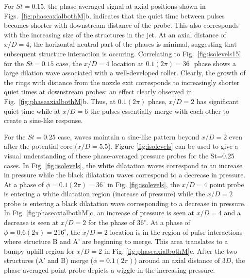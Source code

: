 \documentclass[english]{aiaa-tc}
\begin{document}
For $St=0.15$, the phase averaged signal at axial positions shown in
Figs.~\ref{fig:phaseaxialbothM}b, indicates that the quiet time between
pulses becomes shorter with downstream distance of the probe.  This
also corresponds with the increasing size of the structures in the jet. At an
axial distance of $x/D=4$, the horizontal neutral part of the phases
is minimal, suggesting that subsequent structure interaction is occuring.  Correlating to
Fig.~\ref{fig:isolevels15} for the $St=0.15$ case, the $x/D=4$ location at
$0.1(2\pi)=36^\circ$ phase shows a large dilation wave associated with
a well-developed roller. Clearly, the growth of the rings with
distance from the nozzle exit corresponds to increasingly shorter
quiet times at downstream probes: an effect clearly observed in
Fig.~\ref{fig:phaseaxialbothM}b.  Thus, at $0.1(2\pi)$ phase, $x/D=2$ has
significant quiet time while at $x/D=6$ the pulses essentially merge
with each other to create a sine-like response.

For the $St=0.25$ case, waves maintain a sine-like pattern beyond $x/D=2$ even after the potential core ($x/D=5.5$).
Figure \ref{fig:isolevels} can be used to give a visual understanding of these phase-averaged pressure probes for the St=0.25 cases. In Fig. \ref{fig:isolevels}, the white dilatation waves correspond to an increase in pressure while the black dilatation waves correspond to a decrease in pressure. At a phase of $\phi=0.1(2\pi)=36^\circ$ in Fig. \ref{fig:isolevels}, the $x/D=4$ point probe is entering a white dilatation region (increase of pressure) while the $x/D=2$ probe is entering a black dilatation wave corresponding to a decrease in pressure. In Fig. \ref{fig:phaseaxialbothM}c, an increase of pressure is seen at $x/D=4$ and a decrease is seen at $x/D=2$ for the phase of $36^\circ$. At a phase of $\phi=0.6(2\pi)=216^\circ$, the $x/D=2$ location is in the region of pulse interactions where structure B and A' are beginning to merge. This area translates to a bumpy uphill region for $x/D=2$ in Fig. \ref{fig:phaseaxialbothM}c. After the two structures (A' and B) merge ($\phi=0.1(2\pi)$) around an axial distance of $3D$, the phase averaged point probe depicts a wiggle in the increasing pressure.
\end{document}
